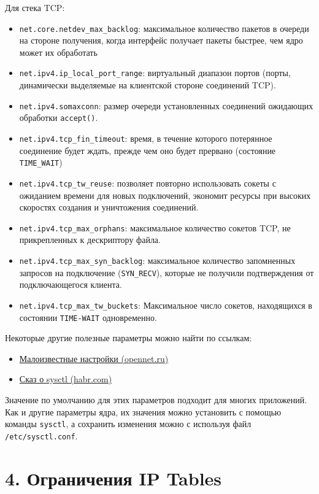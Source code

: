 Для стека TCP:
\begin{itemize}
    \item \texttt{net.core.netdev\_max\_backlog}: максимальное количество пакетов в очереди на стороне получения, когда интерфейс получает пакеты быстрее, чем ядро может их обработать
    \item \texttt{net.ipv4.ip\_local\_port\_range}: виртуальный диапазон портов (порты, динамически выделяемые на клиентской стороне соединений TCP).
    \item \texttt{net.ipv4.somaxconn}: размер очереди установленных соединений ожидающих обработки \texttt{accept()}.
    \item \texttt{net.ipv4.tcp\_fin\_timeout}: время, в течение которого потерянное соединение будет ждать, прежде чем оно будет прервано (состояние \texttt{TIME\_WAIT})
    \item \texttt{net.ipv4.tcp\_tw\_reuse}: позволяет повторно использовать сокеты с ожиданием времени для новых подключений, экономит ресурсы при высоких скоростях создания и уничтожения соединений.
    \item \texttt{net.ipv4.tcp\_max\_orphans}: максимальное количество сокетов TCP, не прикрепленных к дескриптору файла.
    \item \texttt{net.ipv4.tcp\_max\_syn\_backlog}: максимальное количество запомненных запросов на подключение (\texttt{SYN\_RECV}), которые не получили подтверждения от подключающегося клиента.
    \item \texttt{net.ipv4.tcp\_max\_tw\_buckets}: Максимальное число сокетов, находящихся в состоянии \texttt{TIME-WAIT} одновременно.
\end{itemize}

Некоторые другие полезные параметры можно найти по ссылкам:
\begin{itemize}
    \item \hyperlink{https://www.opennet.ru/docs/RUS/LARTC/x1727.html}{Малоизвестные настройки (opennet.ru)}
    \item \hyperlink{https://habr.com/ru/company/otus/blog/340870/}{Сказ о sysctl (habr.com)}
\end{itemize}

Значение по умолчанию для этих параметров подходит для многих приложений. Как и другие параметры ядра, их значения можно установить с помощью команды \texttt{sysctl}, а сохранить изменения можно с используя файл \texttt{/etc/sysctl.conf}.

\section*{4. Ограничения IP Tables}

